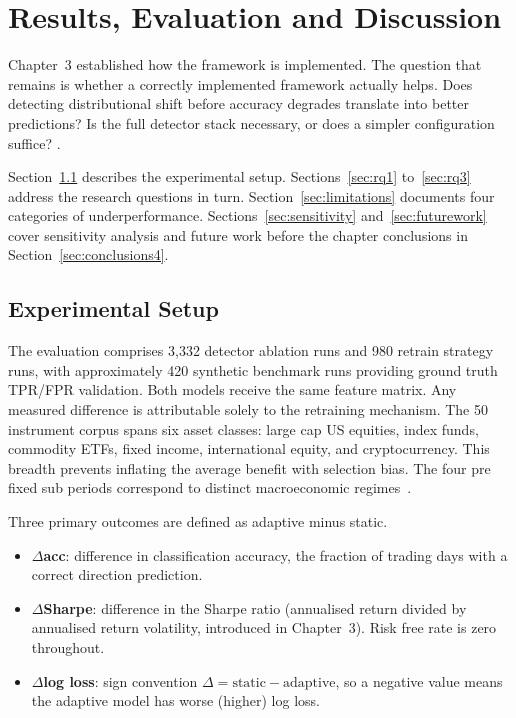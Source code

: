 
\chapter{Results, Evaluation and Discussion}
\label{ch:results}

Chapter~3 established how the framework is implemented. The question that remains is whether a correctly implemented framework actually helps. Does detecting distributional shift before accuracy degrades translate into better predictions? Is the full detector stack necessary, or does a simpler configuration suffice? .

Section~\ref{sec:exp_setup} describes the experimental setup. Sections~\ref{sec:rq1} to~\ref{sec:rq3} address the research questions in turn. Section~\ref{sec:limitations} documents four categories of underperformance. Sections~\ref{sec:sensitivity} and~\ref{sec:futurework} cover sensitivity analysis and future work before the chapter conclusions in Section~\ref{sec:conclusions4}.

\section{Experimental Setup}
\label{sec:exp_setup}

The evaluation comprises 3,332 detector ablation runs and 980 retrain strategy runs, with approximately 420 synthetic benchmark runs providing ground truth TPR/FPR validation. Both models receive the same feature matrix. Any measured difference is attributable solely to the retraining mechanism. The 50 instrument corpus spans six asset classes: large cap US equities, index funds, commodity ETFs, fixed income, international equity, and cryptocurrency. This breadth prevents inflating the average benefit with selection bias. The four pre fixed sub periods correspond to distinct macroeconomic regimes~\cite{hamilton1989,ang2012regime}.

Three primary outcomes are defined as adaptive minus static.

\begin{itemize}
  \item $\Delta$\textbf{acc}: difference in classification accuracy, the fraction of
    trading days with a correct direction prediction.
  \item $\Delta$\textbf{Sharpe}: difference in the Sharpe ratio (annualised return divided by annualised return volatility, introduced in Chapter~3). Risk free rate is zero throughout.
  \item $\Delta$\textbf{log loss}: sign convention $\Delta = \text{static} -
    \text{adaptive}$, so a negative value means the adaptive model has worse
    (higher) log loss.
\end{itemize}

